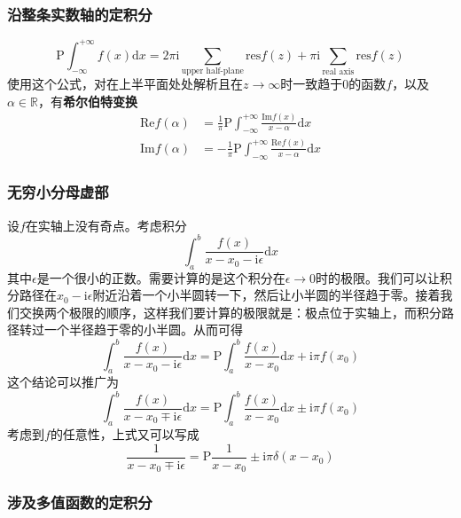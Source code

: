 \documentclass[UTF8]{ctexart}
\newcommand*{\reals}{\mathbb{R}}
\begin{document}
\hypertarget{ux6cbfux6574ux6761ux5b9eux6570ux8f74ux7684ux5b9aux79efux5206}{%
\subsubsection{沿整条实数轴的定积分}\label{ux6cbfux6574ux6761ux5b9eux6570ux8f74ux7684ux5b9aux79efux5206}}

\[
\mathrm{P} \int_{-\infty}^{+\infty} f(x) \mathrm{d}x = 2 \pi  \mathrm{i} \sum_{\text{upper half-plane}} \mathrm{res} f(z) + \pi \mathrm{i} \sum_{\text{real axis}} \mathrm{res} f(z)
\]
使用这个公式，对在上半平面处处解析且在$z \to \infty$时一致趋于0的函数$f$，以及$\alpha \in \reals$，有\textbf{希尔伯特变换}
\[
\begin{aligned}
    \mathrm{Re} f(\alpha) &= \frac{1}{\pi} \mathrm{P} \int_{-\infty}^{+\infty} \frac{\mathrm{Im} f(x)}{x - \alpha} \mathrm{d} x \\
    \mathrm{Im} f(\alpha) &= - \frac{1}{\pi} \mathrm{P} \int_{-\infty}^{+\infty} \frac{\mathrm{Re} f(x)}{x - \alpha} \mathrm{d} x 
\end{aligned}
\]

\hypertarget{ux65e0ux7a77ux5c0fux5206ux6bcdux865aux90e8}{%
\subsubsection{无穷小分母虚部}\label{ux65e0ux7a77ux5c0fux5206ux6bcdux865aux90e8}}

设$f$在实轴上没有奇点。考虑积分 \[
\int_a^b \frac{f(x)}{x-x_0 - \mathrm{i}\epsilon} \mathrm{d}x
\]
其中$\epsilon$是一个很小的正数。需要计算的是这个积分在$\epsilon\to 0$时的极限。我们可以让积分路径在$x_0 - \mathrm{i}\epsilon$附近沿着一个小半圆转一下，然后让小半圆的半径趋于零。接着我们交换两个极限的顺序，这样我们要计算的极限就是：极点位于实轴上，而积分路径转过一个半径趋于零的小半圆。从而可得
\[
\int_a^b \frac{f(x)}{x-x_0 - \mathrm{i}\epsilon} \mathrm{d}x = \mathrm{P} \int_a^b \frac{f(x)}{x-x_0} \mathrm{d}x + \mathrm{i} \pi f(x_0)
\] 这个结论可以推广为 \[
\int_a^b \frac{f(x)}{x-x_0 \mp \mathrm{i}\epsilon} \mathrm{d}x = \mathrm{P} \int_a^b \frac{f(x)}{x-x_0} \mathrm{d}x \pm \mathrm{i} \pi f(x_0)
\] 考虑到$f$的任意性，上式又可以写成 \[
\frac{1}{x - x_0 \mp \mathrm{i}\epsilon} = \mathrm{P} \frac{1}{x - x_0} \pm \mathrm{i} \pi \delta(x - x_0)
\]

\subsubsection{涉及多值函数的定积分}
\end{document}
